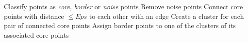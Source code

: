 \begin{algorithmic}[1]
\State Classify points as \textit{core}, \textit{border} or \textit{noise} points
\State Remove noise points
\State Connect core points with distance $\leq Eps$ to each other with an edge
\State Create a cluster for each pair of connected core points
\State Assign border points to one of the clusters of its associated core points
\end{algorithmic}